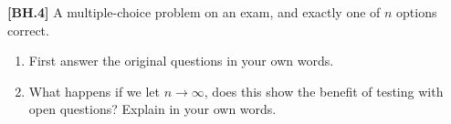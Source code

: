 \begin{exercise}
	\textbf{[BH.4]} A multiple-choice problem on an exam, and exactly one of  $n$ options correct.  
	\begin{enumerate}
				\item First answer the original questions in your own words.
		\item What happens if we let $n\rightarrow \infty$, does this show the benefit of testing with open questions? Explain in your own words.
	\end{enumerate}
\end{exercise}
